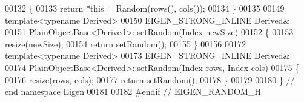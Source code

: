 \begin{DoxyCode}
00132 \{
00133   \textcolor{keywordflow}{return} *\textcolor{keyword}{this} = Random(rows(), cols());
00134 \}
00135 
00149 \textcolor{keyword}{template}<\textcolor{keyword}{typename} Derived>
00150 EIGEN\_STRONG\_INLINE Derived&
\hyperlink{class_eigen_1_1_plain_object_base_af0e576a0e1aefc9ee346de44cc352ba3}{00151} \hyperlink{class_eigen_1_1_plain_object_base_af0e576a0e1aefc9ee346de44cc352ba3}{PlainObjectBase<Derived>::setRandom}(\hyperlink{namespace_eigen_a62e77e0933482dafde8fe197d9a2cfde}{Index} newSize)
00152 \{
00153   resize(newSize);
00154   \textcolor{keywordflow}{return} setRandom();
00155 \}
00156 
00172 \textcolor{keyword}{template}<\textcolor{keyword}{typename} Derived>
00173 EIGEN\_STRONG\_INLINE Derived&
\hyperlink{class_eigen_1_1_plain_object_base_a2139f7c1a6711ebd86c4ff6378f5e775}{00174} \hyperlink{class_eigen_1_1_plain_object_base_af0e576a0e1aefc9ee346de44cc352ba3}{PlainObjectBase<Derived>::setRandom}(\hyperlink{namespace_eigen_a62e77e0933482dafde8fe197d9a2cfde}{Index} rows, 
      \hyperlink{namespace_eigen_a62e77e0933482dafde8fe197d9a2cfde}{Index} cols)
00175 \{
00176   resize(rows, cols);
00177   \textcolor{keywordflow}{return} setRandom();
00178 \}
00179 
00180 \} \textcolor{comment}{// end namespace Eigen}
00181 
00182 \textcolor{preprocessor}{#endif // EIGEN\_RANDOM\_H}
\end{DoxyCode}
